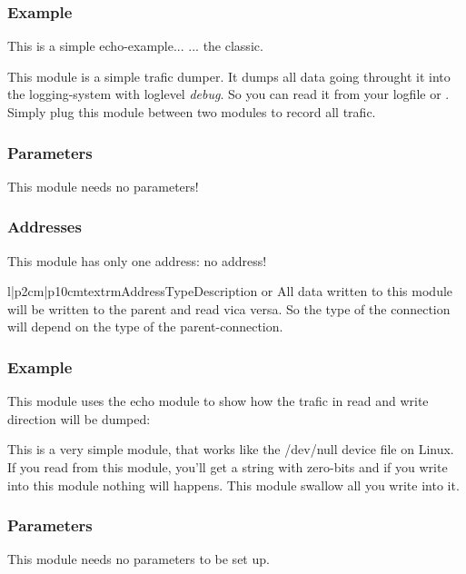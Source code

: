 \subsubsection{Example}
This is a simple echo-example... ... the classic.




%
%
This module is a simple trafic dumper. It dumps all data going throught it
into the logging-system with loglevel \emph{debug}. So you can read it from
your logfile or . Simply plug this module between two modules
to record all trafic.

\subsubsection{Parameters}
This module needs no parameters!

\subsubsection{Addresses}
This module has only one address: no address! 
\begin{tableiii}{l|p{2cm}|p{10cm}}{textrm}{Address}{Type}{Description}
\lineiii{---}
        { or }
        {All data written to this module will be written to the parent and 
         read vica versa. So the type of the connection will depend on the
         type of the parent-connection.}
\end{tableiii}

\subsubsection{Example}
This module uses the echo module to show how the trafic in read and write 
direction will be dumped:




%
%
This is a very simple module, that works like the /dev/null device file on 
Linux. If you read from this module, you'll get a string with zero-bits and
if you write into this module nothing will happens. This module swallow all
you write into it.

\subsubsection{Parameters}
This module needs no parameters to be set up.

